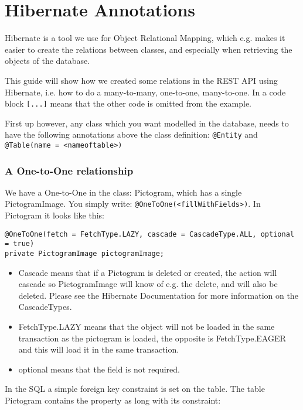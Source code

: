 \newpage
\section{Hibernate Annotations}

Hibernate is a tool we use for Object Relational Mapping, which e.g. makes it easier to create the relations between classes, and especially when retrieving the objects of the database.

This guide will show how we created some relations in the REST API using Hibernate, i.e. how to do a many-to-many, one-to-one, many-to-one.
In a code block \texttt{[...]} means that the other code is omitted from the example.

First up however, any class which you want modelled in the database, needs to have the following annotations above the class definition: \texttt{@Entity} and \texttt{@Table(name = <nameoftable>)}

\subsubsection*{A One-to-One relationship}

We have a One-to-One in the class: Pictogram, which has a single PictogramImage.
You simply write:  \texttt{@OneToOne(<fillWithFields>)}.
In Pictogram it looks like this:

\begin{lstlisting}[caption={A One-to-One relationship using \texttt{PictogramImage}, on \texttt{Pictogram}.}]
@OneToOne(fetch = FetchType.LAZY, cascade = CascadeType.ALL, optional = true)
private PictogramImage pictogramImage;
\end{lstlisting}


\begin{itemize}
\item Cascade means that if a Pictogram is deleted or created, the action will cascade so PictogramImage will know of e.g. the delete, and will also be deleted. Please see the Hibernate Documentation for more information on the CascadeTypes.
\item FetchType.LAZY means that the object will not be loaded in the same transaction as the pictogram is loaded, the opposite is FetchType.EAGER and this will load it in the same transaction.
\item optional means that the field is not required.
\end{itemize}

In the SQL a simple foreign key constraint is set on the table. The table Pictogram contains the property as long with its constraint:


